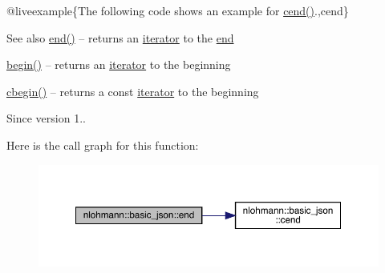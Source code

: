 @liveexample\{The following code shows an example for {\ttfamily \mbox{\hyperlink{classnlohmann_1_1basic__json_a8dba7b7d2f38e6b0c614030aa43983f6}{cend()}}}.,cend\}

\begin{DoxySeeAlso}{See also}
\mbox{\hyperlink{classnlohmann_1_1basic__json_a13e032a02a7fd8a93fdddc2fcbc4763c}{end()}} -- returns an \mbox{\hyperlink{classnlohmann_1_1basic__json_a099316232c76c034030a38faa6e34dca}{iterator}} to the \mbox{\hyperlink{classnlohmann_1_1basic__json_a13e032a02a7fd8a93fdddc2fcbc4763c}{end}} 

\mbox{\hyperlink{classnlohmann_1_1basic__json_a0ff28dac23f2bdecee9564d07f51dcdc}{begin()}} -- returns an \mbox{\hyperlink{classnlohmann_1_1basic__json_a099316232c76c034030a38faa6e34dca}{iterator}} to the beginning 

\mbox{\hyperlink{classnlohmann_1_1basic__json_ad865d6c291b237ae508d5cb2146b5877}{cbegin()}} -- returns a const \mbox{\hyperlink{classnlohmann_1_1basic__json_a099316232c76c034030a38faa6e34dca}{iterator}} to the beginning
\end{DoxySeeAlso}
\begin{DoxySince}{Since}
version 1.. 
\end{DoxySince}
Here is the call graph for this function\+:
\nopagebreak
\begin{figure}[H]
\begin{center}
\leavevmode
\includegraphics[width=350pt]{classnlohmann_1_1basic__json_a1c15707055088cd5436ae91db72cbe67_cgraph}
\end{center}
\end{figure}
\mbox{\label{classnlohmann_1_1basic__json_a068a16e76be178e83da6a192916923ed}} 
